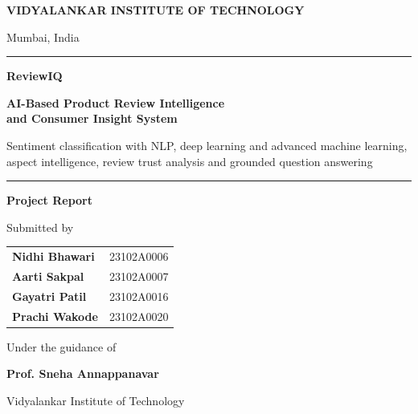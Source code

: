 \documentclass[12pt,a4paper]{report}
\begin{document}
\begin{titlepage}
\thispagestyle{empty}
\centering
{\Large\bfseries\color{navy} VIDYALANKAR INSTITUTE OF TECHNOLOGY\par}
\vspace{2pt}
{\large Mumbai, India\par}
\vspace{1.2cm}
\rule{\textwidth}{1.2pt}\par
\vspace{0.6cm}
{\Huge\bfseries\color{accent} ReviewIQ\par}
\vspace{0.3cm}
{\LARGE\bfseries AI-Based Product Review Intelligence\\ and Consumer Insight System\par}
\vspace{0.4cm}
{\large Sentiment classification with NLP, deep learning and advanced machine learning,\\ aspect intelligence, review trust analysis and grounded question answering\par}
\vspace{0.6cm}
\rule{\textwidth}{1.2pt}\par
\vspace{1.2cm}
{\large\bfseries Project Report\par}
\vspace{0.8cm}
{\large Submitted by\par}
\vspace{0.4cm}
\begin{tabular}{lr}
\textbf{Nidhi Bhawari} & 23102A0006 \\[4pt]
\textbf{Aarti Sakpal} & 23102A0007 \\[4pt]
\textbf{Gayatri Patil} & 23102A0016 \\[4pt]
\textbf{Prachi Wakode} & 23102A0020 \\
\end{tabular}
\vspace{1.2cm}

{\large Under the guidance of\par}
\vspace{0.3cm}
{\Large\bfseries Prof. Sneha Annappanavar\par}
\vfill
{\large Vidyalankar Institute of Technology\par}
\end{titlepage}

\end{document}
